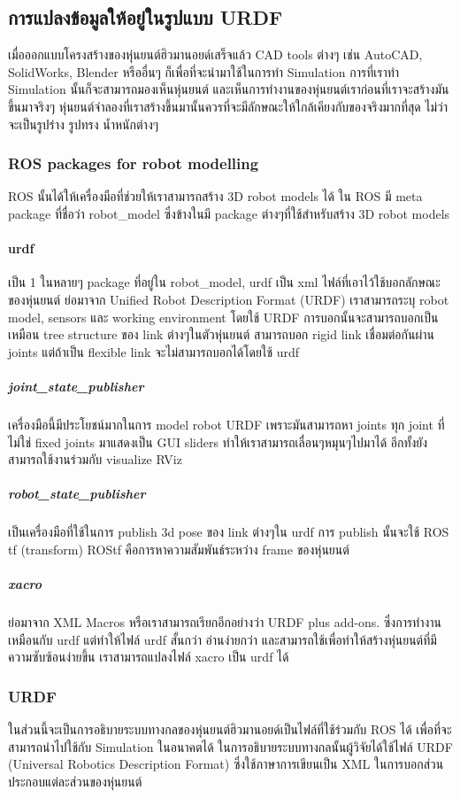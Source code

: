 \subsection{การแปลงข้อมูลให้อยู่ในรูปแบบ URDF}
เมื่อออกแบบโครงสร้างของหุ่นยนต์ฮิวมานอยด์เสร็จแล้ว CAD tools ต่างๆ เช่น AutoCAD, SolidWorks, Blender
หรืออื่นๆ ก็เพื่อที่จะนำมาใช้ในการทำ Simulation การที่เราทำ Simulation นั้นก็จะสามารถมองเห็นหุ่นยนต์
และเห็นการทำงานของหุ่นยนต์เราก่อนที่เราจะสร้างมันขึ้นมาจริงๆ หุ่นยนต์จำลองที่เราสร้างขึ้นมานั้นควรที่จะมีลักษณะให้ใกล้เคียงกับของจริงมากที่สุด
ไม่ว่าจะเป็นรูปร่าง รูปทรง น้ำหนักต่างๆ 

\subsubsection{ROS packages for robot modelling}
ROS นั้นได้ให้เครื่องมือที่ช่วยให้เราสามารถสร้าง 3D robot models ได้
ใน ROS มี meta package ที่ชื่อว่า robot\_model ซึ่งข้างในมี package ต่างๆที่ใช้สำหรับสร้าง 3D robot models
        
\paragraph*{urdf}
เป็น 1 ในหลายๆ package ที่อยู่ใน robot\_model, urdf เป็น xml ไฟล์ที่เอาไว้ใช้บอกลักษณะของหุ่นยนต์ ย่อมาจาก Unified Robot Description Format (URDF)
เราสามารถระบุ robot model, sensors และ working environment โดยใช้ URDF การบอกนั้นจะสามารถบอกเป็นเหมือน tree structure ของ link ต่างๆในตัวหุ่นยนต์ สามารถบอก rigid link เชื่อมต่อกันผ่าน joints แต่ถ้าเป็น flexible link จะไม่สามารถบอกได้โดยใช้ urdf

\subparagraph*{joint\_state\_publisher}
เครื่องมือนี้มีประโยชน์มากในการ model robot URDF เพราะมันสามารถหา joints ทุก joint ที่ไม่ใช่ fixed joints มาแสดงเป็น GUI sliders ทำให้เราสามารถเลื่อนๆหมุนๆไปมาได้ อีกทั้งยังสามารถใช้งานร่วมกับ visualize RViz

\subparagraph*{robot\_state\_publisher}
เป็นเครื่องมือที่ใช้ในการ publish 3d pose ของ link ต่างๆใน urdf การ publish นั้นจะใช้ ROS tf (transform) ROStf คือการหาความสัมพันธ์ระหว่าง frame ของหุ่นยนต์

\subparagraph*{xacro}
ย่อมาจาก XML Macros หรือเราสามารถเรียกอีกอย่างว่า URDF plus add-ons. ซึ่งการทำงานเหมือนกับ urdf แต่ทำให้ไฟล์ urdf สั้นกว่า อ่านง่ายกว่า และสามารถใช้เพื่อทำให้สร้างหุ่นยนต์ที่มีความซับซ้อนง่ายขึ้น เราสามารถแปลงไฟล์ xacro เป็น urdf ได้

\subsubsection{URDF}
ในส่วนนี้จะเป็นการอธิบายระบบทางกลของหุ่นยนต์ฮิวมานอยด์เป็นไฟล์ที่ใช้ร่วมกับ ROS ได้ เพื่อที่จะสามารถนำไปใช้กับ Simulation ในอนาคตได้
ในการอธิบายระบบทางกลนั้นผู้วิจัยได้ใช้ไฟล์ URDF (Universal Robotics Description Format) ซึ่งใช้ภาษาการเขียนเป็น XML ในการบอกส่วนประกอบแต่ละส่วนของหุ่นยนต์

